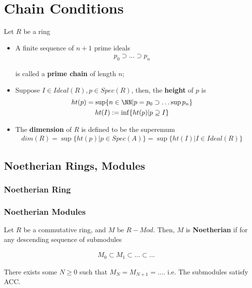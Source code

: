 \documentclass[Total.tex]{subfiles}
\begin{document}
		\chapter{Chain Conditions}
		
		
		\begin{Def} Let $R$ be a ring
			\begin{itemize}
				\item A finite sequence of $n+1$ prime ideals
				\begin{gather*}
					p_0\supset \dots\supset p_n
				\end{gather*}
				
				is called a \textbf{prime chain} of length $n$;
				\item Suppose $I\in Ideal(R),p\in Spec(R)$, then, the \textbf{height} of $p$ is
				\begin{gather*}
					ht(p)=\sup\{n\in \NN|p=p_0\supset \dots\sup p_n\}\\
					ht(I):=\inf\{ht(p)|p\supseteq I\}
				\end{gather*}
				
				\item The \textbf{dimension} of $R$ is defined to be the superemum
				\begin{gather*}
					dim(R)=\sup\{ht(p)|p\in Spec(A)\}=\sup \{ht(I)|I\in Ideal(R)\}
				\end{gather*}
			\end{itemize}
		\end{Def}
		
		\section{Noetherian Rings, Modules}
		
		\subsection{Noetherian Ring}
		
		\begin{Def}
		\end{Def}
		
		\subsection{Noetherian Modules}
		
		\begin{Def}
			Let $R$ be a commutative ring, and $M$ be $R-Mod$. Then, $M$ is \textbf{Noetherian} if for any descending sequence of submodules
			
			\begin{gather*}
				M_0\subset M_1\subset \dots\subset \dots
			\end{gather*}
			
			There exists some $N\geq 0$ such that $M_{N}=M_{N+1}=\dots$. i.e. The submodules satisfy ACC.
		\end{Def}
		
\end{document}
